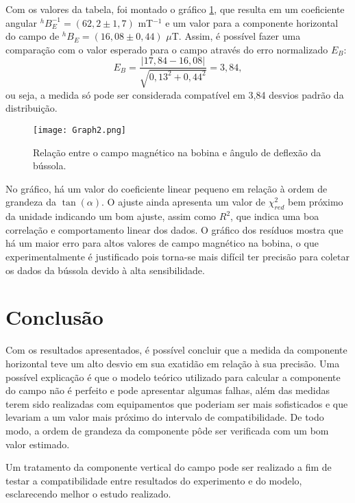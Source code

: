 \documentclass[reprint,amsmath,amssymb,aps]{revtex4-2}
\begin{document}
Com os valores da tabela, foi montado o gráfico \ref{fig:medida}, que resulta em um coeficiente angular $^hB_E^{-1}=(62,2\pm1,7)$ mT$^{-1}$ e um valor para a componente horizontal do campo de $^hB_E=(16,08\pm0,44)$ $\mu$T. Assim, é possível fazer uma comparação com o valor esperado para o campo através do erro normalizado $E_B$:
\begin{equation}
    E_B=\frac{|17,84-16,08|}{\sqrt{0,13^2+0,44^2}}=3,84,
\end{equation}
ou seja, a medida só pode ser considerada compatível em 3,84 desvios padrão da distribuição. 

\begin{figure}[H]
    \centering
    \texttt{[image: Graph2.png]}
    \caption{Relação entre o campo magnético na bobina e ângulo de deflexão da bússola.}
    \label{fig:medida}
\end{figure}

No gráfico, há um valor do coeficiente linear pequeno em relação à ordem de grandeza da $\tan(\alpha)$. O ajuste ainda apresenta um valor de $\chi_{red}^2$ bem próximo da unidade indicando um bom ajuste, assim como $R^2$, que indica uma boa correlação e comportamento linear dos dados. O gráfico dos resíduos mostra que há um maior erro para altos valores de campo magnético na bobina, o que experimentalmente é justificado pois torna-se mais difícil ter precisão para coletar os dados da bússola devido à alta sensibilidade.

\section{Conclusão}

Com os resultados apresentados, é possível concluir que a medida da componente horizontal teve um alto desvio em sua exatidão em relação à sua precisão. Uma possível explicação é que o modelo teórico utilizado para calcular a componente do campo não é perfeito e pode apresentar algumas falhas, além das medidas terem sido realizadas com equipamentos que poderiam ser mais sofisticados e que levariam a um valor mais próximo do intervalo de compatibilidade. De todo modo, a ordem de grandeza da componente pôde ser verificada com um bom valor estimado.


Um tratamento da componente vertical do campo pode ser realizado a fim de testar a compatibilidade entre resultados do experimento e do modelo, esclarecendo melhor o estudo realizado.

\newpage

\nocite{*}


\end{document}
